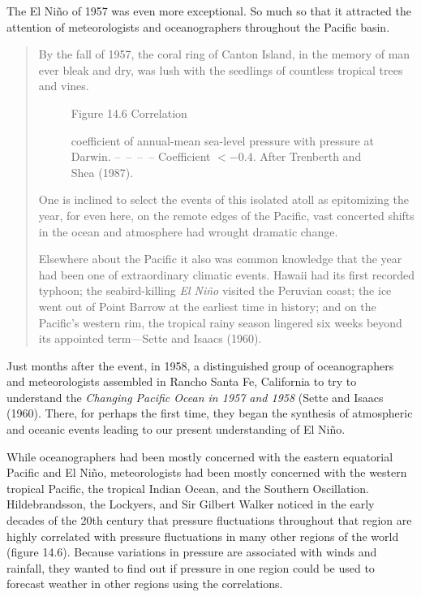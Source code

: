 The El Ni\~{n}o of 1957 was even more exceptional. So much so that it attracted
the attention of meteorologists and oceanographers throughout the Pacific basin.
\begin{quotation} \small
By the fall of 1957, the coral ring of Canton Island, in the memory of man ever
bleak and dry, was lush with the seedlings of countless tropical trees and
vines.

\begin{figure}[b!]
\vspace{-1ex}
\centering
{}
\footnotesize
Figure 14.6 Correlation \rule{0pt}{3ex}coefficient of annual-mean sea-level
pressure with pressure at Darwin. --\ --\ --\ -- Coefficient $< -0.4$. After
Trenberth and Shea (1987).

\label{fig:ensocorrelations}
\end{figure}
One is inclined to select the events of this isolated atoll as epitomizing the
year, for even here, on the remote edges of the Pacific, vast concerted shifts
in the ocean and atmosphere had wrought dramatic change.

Elsewhere about the Pacific it also was common knowledge that the year had been
one of extraordinary climatic events. Hawaii had its first recorded typhoon;
the seabird-killing \textit{El Ni\~{n}o} visited the Peruvian coast; the ice
went out of Point Barrow at the earliest time in history; and on the Pacific's
western rim, the tropical rainy season lingered six weeks beyond its appointed
term---Sette and Isaacs (1960).
\end{quotation}

Just months after the event, in 1958, a distinguished group of oceanographers
and meteorologists assembled in Rancho Santa Fe, California to try to understand
the \textit{Changing Pacific Ocean in 1957 and 1958} (Sette and Isaacs (1960). There, for
perhaps the first time, they began the synthesis of atmospheric and oceanic events leading to
our present understanding of El Ni\~{n}o.

While oceanographers had been mostly concerned with the eastern equatorial
Pacific and El Ni\~{n}o, meteorologists had been mostly concerned with the
western tropical Pacific, the tropical Indian Ocean, and the
Southern Oscillation. Hildebrandsson, the Lockyers, and Sir
Gilbert Walker noticed in the early decades of the 20th century that pressure fluctuations
throughout that region are highly correlated with pressure fluctuations in many
other regions of the world (figure 14.6). Because variations in pressure are
associated with winds and rainfall, they wanted to find out if pressure in
one region could be used to forecast weather in other regions using the
correlations.

